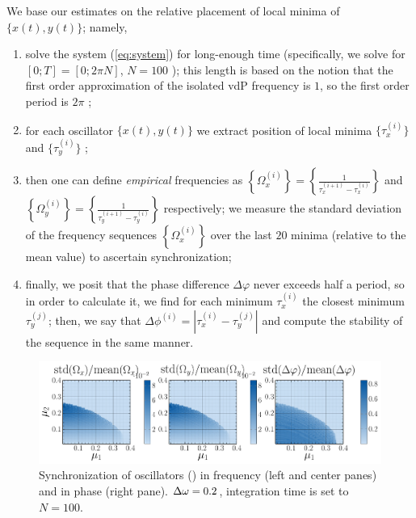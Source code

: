 \documentclass{mynotes}
\begin{document}
We base our estimates on the relative placement of local minima of \( \{ x(t), y(t) \} \); namely,
\begin{enumerate}[ topsep = -0.5em, itemsep = -0.25em ]
      \item[\color{rwth-blue}(i)] solve the system (\eqref{eq:system}) for long-enough time (specifically, we solve for \( [ 0; T ] = [ 0; 2 \pi N ]\), \( N = 100 \) ); this length is based on the notion that the first order approximation of the isolated vdP frequency is \( 1 \), so the first order period is \( 2 \pi \) ;
      \item[\color{rwth-blue}(ii)] for each oscillator \( \{ x(t), y(t) \} \) we extract position of local minima \( \{ \tau_x^{(i)} \}\) and \( \{ \tau_y^{(i)} \}\)  ;
      \item[\color{rwth-blue}(iii)] then one can define \textit{empirical} frequencies as \( \left\{ \Omega_x^{(i)} \right\} = \left\{ \frac{1}{ \tau_x^{(i+1)} - \tau_x^{(i)} } \right\} \) and \( \left\{ \Omega_y^{(i)} \right\} = \left\{ \frac{1}{ \tau_y^{(i+1)} - \tau_y^{(i)} } \right\} \) respectively; we measure the standard deviation of the frequency sequences \( \left\{ \Omega_x^{(i)} \right\} \) over the last \( 20 \) minima (relative to the mean value) to ascertain synchronization;
      \item[\color{rwth-blue}(iv)] finally, we posit that the phase difference \( \Delta\varphi \) never exceeds half a period, so in order to calculate it, we find for each minimum \( \tau_x^{(i)} \) the closest minimum \( \tau_y^{(j)} \); then, we say that \( \Delta\phi^{(i)} = \left| \tau_x^{(i)} - \tau_y^{(j)} \right| \) and compute the stability of the sequence in the same manner. 
\end{enumerate}
 
\begin{figure}[hbtp]
      \centering
      \includegraphics[width = 1.0\columnwidth]{figures/synch_heatmap.pdf}
      \caption{
            Synchronization of oscillators () in frequency (left and center panes) and in phase (right pane). \( \Delta\omega = 0.2 \), integration time is set to \( N = 100 \).
            \label{fig:synch_heatmap}
      }
\end{figure}
\end{document}
